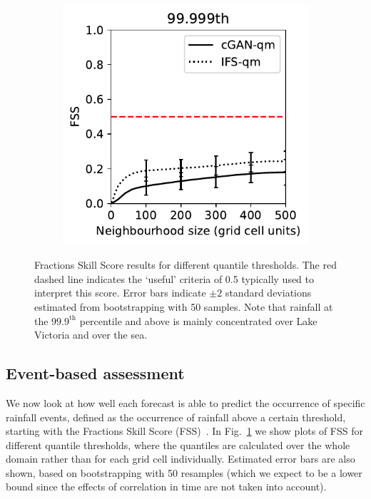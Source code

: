 \documentclass{article}
\begin{document}
\begin{figure}[t]
\begin{subfigure}[t]{0.32\textwidth}
     \caption{}
     \end{subfigure}
     \begin{subfigure}[t]{0.32\textwidth}
     \includegraphics[width=\textwidth]{images/fss_q99.999th_final-nologs_217600.pdf}
     \caption{}
     \end{subfigure}
     \caption{Fractions Skill Score results for different quantile thresholds. The red dashed line indicates the `useful' criteria of 0.5 typically used to interpret this score. Error bars indicate $\pm2$ standard deviations estimated from bootstrapping with 50 samples. Note that rainfall at the $99.9^{\text{th}}$ percentile and above is mainly concentrated over Lake Victoria and over the sea. }
     \label{fig:fss}
\end{figure}




\subsection{Event-based assessment}


We now look at how well each forecast is able to predict the occurrence of specific rainfall events, defined as the occurrence of rainfall above a certain threshold, starting with the Fractions Skill Score (FSS)~\citep{roberts_assessing_2008, roberts_scale-selective_2008}. In Fig.~\ref{fig:fss} we show plots of FSS for different quantile thresholds, where the quantiles are calculated over the whole domain rather than for each grid cell individually. Estimated error bars are also shown, based on bootstrapping with 50 resamples (which we expect to be a lower bound since the effects of correlation in time are not taken into account). 
\end{document}
